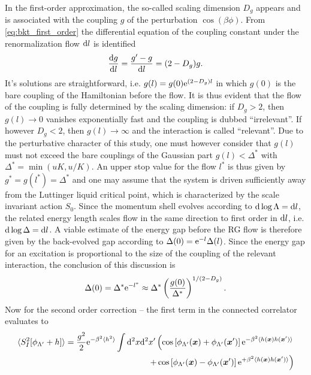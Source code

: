 In the first-order approximation, the so-called scaling dimension $D_g$ appears and is associated with the coupling $g$ of the perturbation $\cos(\beta\phi)$.
From \cref{eq:bkt_first_order} the differential equation of the coupling constant under the renormalization flow $\mathrm d l$ is identified
\begin{align}
    \frac{\mathrm d g}{\mathrm d l} = \frac{g'-g}{\mathrm d l} = (2-D_g)g.
\end{align}
It's solutions are straightforward, i.e. $g(l) = g(0)\mathrm e^{(2-D_g)l}$ in which $g(0)$ is the bare coupling of the Hamiltonian before the flow.
It is thus evident that the flow of the coupling is fully determined by the scaling dimension: if $D_g>2$, then $g(l)\rightarrow0$ vanishes exponentially fast and the coupling is dubbed ``irrelevant''.
If however $D_g<2$, then $g(l)\rightarrow\infty$ and the interaction is called ``relevant''.
Due to the perturbative character of this study, one must however consider that $g(l)$ must not exceed the bare couplings of the Gaussian part $g(l)<\Delta^*$ with $\Delta^*=\min(uK,u/K)$.
An upper stop value for the flow $l^*$ is thus given by $g^*=g(l^*)=\Delta^*$ and one may assume that the system is driven sufficiently away from the Luttinger liquid critical point, which is characterized by the scale invariant action $S_0$.
Since the momentum shell evolves according to $\mathrm d\log\Lambda=\mathrm d l$, the related energy length scales flow in the same direction to first order in $\mathrm d l$, i.e. $\mathrm d\log\Delta = \mathrm d l$.
A viable estimate of the energy gap before the RG flow is therefore given by the back-evolved gap according to $\Delta(0)=\mathrm e^{-l}\Delta(l)$.
Since the energy gap for an excitation is proportional to the size of the coupling of the relevant interaction, the conclusion of this discussion is
\begin{align}
    \Delta(0) = \Delta^*\mathrm e^{-l^*} \approx \Delta^*\left( \frac{g(0)}{\Delta^*} \right)^{1/(2-D_g)}.
\end{align}
Now for the second order correction -- the first term in the connected correlator evaluates to
\begin{align}
    \braket{S^2_I[\phi_{\Lambda'}+h]}=\frac{g^2}2\mathrm e^{-\beta^2\braket{h^2}}\int\mathrm d^2x\mathrm d^2x'
    \left(
        \cos\left[ \phi_{\Lambda'}({\bm x})+\phi_{\Lambda'}({\bm x'}) \right]\mathrm e^{-\beta^2\braket{h({\bm x})h({\bm x'})}}
        \right.\\
        \left.+
        \cos\left[ \phi_{\Lambda'}({\bm x})-\phi_{\Lambda'}({\bm x'}) \right]\mathrm e^{+\beta^2\braket{h({\bm x})h({\bm x'})}}
    \right)
    \label{eq:second_order_rg_term1}
\end{align}

